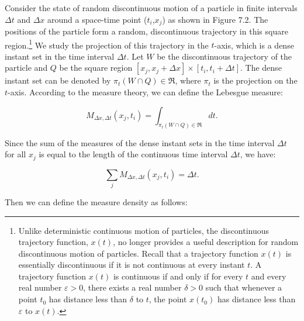 Consider the state of random discontinuous motion of a particle in finite intervals $\Delta t$ and $\Delta x$ around a space-time point ($t_i$,$x_j$) as shown in Figure 7.2. The positions of the particle form a random, discontinuous trajectory in this square region.\footnote{Unlike deterministic continuous motion of particles, the discontinuous trajectory function, $x(t)$, no longer provides a useful description for random discontinuous motion of particles. Recall that a trajectory function $x(t)$ is essentially discontinuous if it is not continuous at every instant $t$. A trajectory function $x(t)$ is continuous if and only if for every $t$ and every real number $\varepsilon >0$, there exists a real number $\delta >0$ such that whenever a point $t_0$ has distance less than $\delta$ to $t$, the point $x(t_0)$  has distance less than $\varepsilon$ to $x(t)$.}
We study the projection of this trajectory in the $t$-axis, which is a dense instant set in the time interval $\Delta t$. Let $W$ be the discontinuous trajectory of the particle and $Q$ be the square region $[x_j,x_j+\Delta x] \times [t_i,t_i+\Delta t] $. The dense instant set can be denoted by $\pi_t(W \cap Q) \in \Re$, where $\pi_t$ is the projection on the $t$-axis. According to the measure theory, we can define the Lebesgue measure:

\begin{equation}
M_{\Delta x,\Delta t}(x_j,t_i)=\int_{\pi_t(W \cap Q) \in \Re}dt.  
\label{}
\end{equation}

\noindent Since the sum of the measures of the dense instant sets in the time interval $\Delta t$ for all $x_j$ is equal to the length of the continuous time interval $\Delta t$, we have: 

\begin{equation}
\sum_j {M_{\Delta x,\Delta t}(x_j,t_i)}=\Delta t.
\label{m}
\end{equation}

\noindent Then we can define the measure density as follows:

